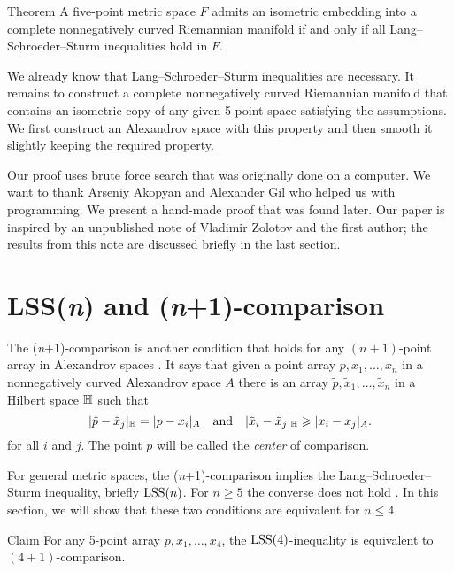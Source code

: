 \documentclass{article}
\begin{document}
\begin{thm}{Theorem}\label{thm:main}
A five-point metric space $F$ admits an isometric embedding into a complete nonnegatively curved Riemannian manifold
if and only if all Lang--Schroeder--Sturm inequalities hold in $F$.
\end{thm}

We already know that Lang--Schroeder--Sturm inequalities are necessary.
It remains to construct a complete nonnegatively curved Riemannian manifold that contains an isometric copy of any given 5-point space satisfying the assumptions.
We first construct an Alexandrov space with this property and then smooth it slightly keeping the required property.

Our proof uses brute force search that was originally done on a computer.
We want to thank Arseniy Akopyan and Alexander Gil who helped us with programming.
We present a hand-made proof that was found later.
Our paper is inspired by an unpublished note of Vladimir Zolotov and the first author;
the results from this note are discussed briefly in the last section.


\section{LSS(\textit{n}) and (\textit{n}+1)-comparison}


The (\textit{n}+1)-comparison is another condition that holds for any $(n+1)$-point array in  Alexandrov spaces \cite{alexander2019alexandrov,AKP-Kirszbraun}.
It says that given a point array $p,x_1,\dots,x_n$ in a nonnegatively curved Alexandrov space $A$ 
there is an array $\tilde p,\tilde x_1,\dots,\tilde x_n$ in a Hilbert space $\mathbb H$ such that 
\[
|\tilde p-\tilde x_j|_{\mathbb H}=|p-x_i|_{A}
\quad
\text{and}
\quad
|\tilde x_i-\tilde x_j|_{\mathbb H}\geqslant |x_i-x_j|_{A}.
\]
for all $i$ and $j$.
The point $p$ will be called the \emph{center} of comparison.

For general metric spaces, the (\textit{n}+1)-comparison implies the Lang--Schroeder--Sturm inequality,  briefly $\mathrm{LSS}(n)$.
For $n\ge 5$ the converse does not hold \cite[Section 8]{lebedeva-petrunin-zolotov}.
In this section, we will show that these two conditions are equivalent for $n\le 4$.

\begin{thm}{Claim}\label{clm:(4+1)=LSS(4)}
For any 5-point array $p,x_1,\dots,x_4$, the
$\mathrm{LSS}(4)$-inequality is equivalent to $(4+1)$-comparison.
\end{thm}
\end{document}
